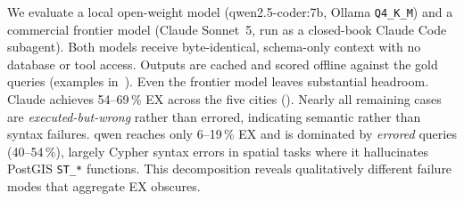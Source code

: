 \documentclass[sigconf,authordraft]{acmart}
\begin{document}
We evaluate a local open-weight model (qwen2.5-coder:7b, Ollama \texttt{Q4\_K\_M}) and a commercial frontier model (Claude Sonnet~5, run as a closed-book Claude Code subagent). Both models receive byte-identical, schema-only context with no database or tool access. Outputs are cached and scored offline against the gold queries (examples in~).
Even the frontier model leaves substantial headroom. Claude achieves 54--69\,\% EX across the five cities (). Nearly all remaining cases are \emph{executed-but-wrong} rather than errored, indicating semantic rather than syntax failures. qwen reaches only 6--19\,\% EX and is dominated by \emph{errored} queries (40--54\,\%), largely Cypher syntax errors in spatial tasks where it hallucinates PostGIS \texttt{ST\_*} functions. This decomposition reveals qualitatively different failure modes that aggregate EX obscures.
\end{document}
